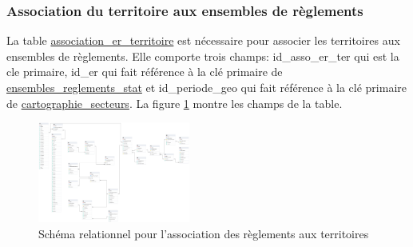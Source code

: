     
    \subsubsection{Association du territoire aux ensembles de règlements}
    La table \underline{association\_er\_territoire} est nécessaire pour associer les territoires aux ensembles de règlements. Elle comporte trois champs: id\_asso\_er\_ter qui est la cle primaire, id\_er qui fait référence à la clé primaire de \underline{ensembles\_reglements\_stat} et id\_periode\_geo qui fait référence à la clé primaire de \underline{cartographie\_secteurs}. La figure \ref{fig:offstreet_db_erd_er_ter} montre les champs de la table.
    \begin{figure}[h]
        \centering
        \includegraphics[trim={28cm 25cm 55cm 30cm},clip,width=5cm]{images/structure_base_de_donnee.png}
        \caption{Schéma relationnel pour l'association des règlements aux territoires}
        \label{fig:offstreet_db_erd_er_ter}
    \end{figure}
    \FloatBarrier

    
